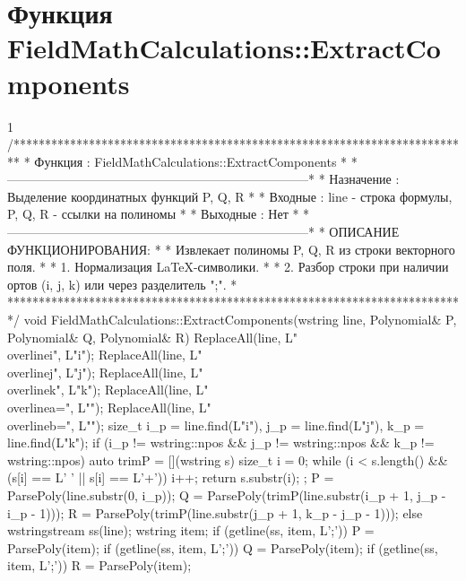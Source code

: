 \section{Функция FieldMathCalculations::ExtractComponents}
\footnotesize
\begin{listing}{1}
/*************************************************************************
* Функция       : FieldMathCalculations::ExtractComponents               *
*------------------------------------------------------------------------*
* Назначение    : Выделение координатных функций P, Q, R                 *
* Входные       : line - строка формулы, P, Q, R - ссылки на полиномы    *
* Выходные      : Нет                                                    *
*------------------------------------------------------------------------*
* ОПИСАНИЕ ФУНКЦИОНИРОВАНИЯ:                                             *
* Извлекает полиномы P, Q, R из строки векторного поля.                  *
* 1. Нормализация LaTeX-символики.                                       *
* 2. Разбор строки при наличии ортов (i, j, k) или через разделитель ";". *
*************************************************************************/
void FieldMathCalculations::ExtractComponents(wstring line, Polynomial& P, 
                                              Polynomial& Q, Polynomial& R) {
    ReplaceAll(line, L"\\overline{i}", L"i"); 
    ReplaceAll(line, L"\\overline{j}", L"j");
    ReplaceAll(line, L"\\overline{k}", L"k"); 
    ReplaceAll(line, L"\\overline{a}=", L""); 
    ReplaceAll(line, L"\\overline{b}=", L"");
    size_t i_p = line.find(L"i"), j_p = line.find(L"j"), k_p = line.find(L"k");
    if (i_p != wstring::npos && j_p != wstring::npos && k_p != wstring::npos) {
        auto trimP = [](wstring s) { 
            size_t i = 0; 
            while (i < s.length() && (s[i] == L' ' || s[i] == L'+')) i++; 
            return s.substr(i); };
        P = ParsePoly(line.substr(0, i_p)); 
        Q = ParsePoly(trimP(line.substr(i_p + 1, j_p - i_p - 1))); 
        R = ParsePoly(trimP(line.substr(j_p + 1, k_p - j_p - 1)));}
    else {
        wstringstream ss(line); wstring item;
        if (getline(ss, item, L';')) P = ParsePoly(item);
        if (getline(ss, item, L';')) Q = ParsePoly(item);
        if (getline(ss, item, L';')) R = ParsePoly(item);
    }
}
\end{listing}
\normalsize

\pagebreak